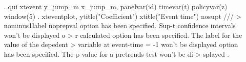 . qui xtevent y_jump_m x_jump_m, panelvar(id) timevar(t) policyvar(z) window(5) 
{\smallskip}
. xteventplot, ytitle("Coefficient") xtitle("Event time") nosupt ///
>  nominus1label noprepval 
{\smallskip}
option {} has been specified. Sup-t confidence intervals won't be displayed o
> r calculated
{\smallskip}
option {} has been specified. The label for the value of the depedent 
> variable at event-time = -1 won't be displayed
{\smallskip}
option {} has been specified. The p-value for a pretrends test won't be di
> splayed
{\smallskip}
. 
